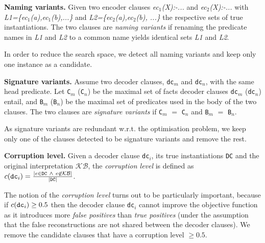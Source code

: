 \begin{definition}
\textbf{Naming variants.}
Given two encoder clauses \textit{ec$_1$(X):\!-...}
and \textit{ec$_2$(X):\!-...}
with \textit{L1=\{ec$_1$(a),ec$_1$(b),...\}} and \textit{L2=\{ec$_2$(a),ec$_2$(b), ...\}} the respective sets of true instantiations.
The two clauses are \textit{naming variants} if renaming the predicate names in \textit{L1} and \textit{L2} to a common name yields identical sets \textit{L1} and \textit{L2}.
\end{definition}


In order to reduce the search space, we detect all naming variants and keep only one instance as a candidate.


\begin{definition}
\textbf{Signature variants.}
Assume two decoder clauses, \texttt{dc}$_m$ and \texttt{dc}$_n$, with the same head predicate.
Let \texttt{C}$_m$ (\texttt{C}$_n$) be the maximal set of facts decoder clauses \texttt{dc}$_m$ (\texttt{dc}$_n$) entail, and \texttt{B}$_m$ (\texttt{B}$_n$) be the maximal set of predicates used in the body of the two clauses.
The two clauses are \textit{signature variants} if \texttt{C}$_m$ $=$ \texttt{C}$_n$ and \texttt{B$_m$} $=$ \texttt{B$_n$}.
\end{definition}

As signature variants are redundant w.r.t. the optimisation problem, we keep only one of the clauses detected to be signature variants and remove the rest.


\begin{definition}
\textbf{Corruption level.}
Given a decoder clause \texttt{dc}$_i$, its true instantiations \texttt{DC} and the original interpretation $\mathcal{KB}$, the \textit{corruption level} is defined as $c(\text{\texttt{dc}}_i) = \frac{|e \in \texttt{DC}\ \wedge\ e \not \in \mathcal{KB}|}{|\text{\texttt{DC}}|}$.
\end{definition}

The notion of the \textit{corruption level} turns out to be particularly important, because if $c(\text{\texttt{dc}}_i) \geq 0.5$ then the decoder clause \texttt{dc}$_i$ cannot improve the objective function as it introduces more \textit{false positives} than \textit{true positives} (under the assumption that the false reconstructions are not shared between the decoder clauses).
We remove the candidate clauses that have a corruption level $\geq 0.5$.






